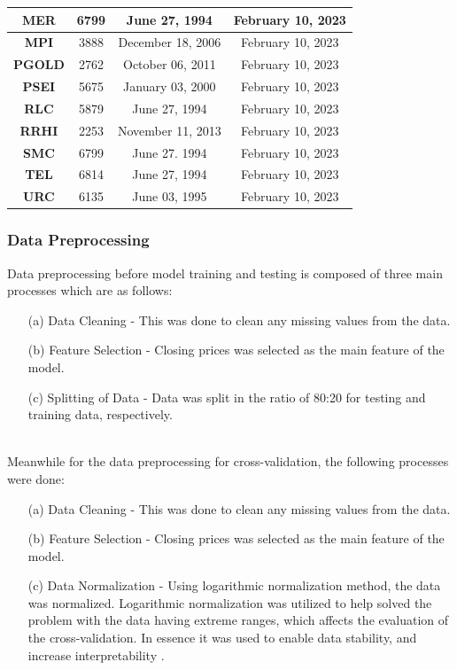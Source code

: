 \begin{longtable}{|c|c|c|c|}
    \textbf{MER}   & 6799                & June 27, 1994       & February 10, 2023 \\ \hline
    \textbf{MPI}   & 3888                & December 18, 2006   & February 10, 2023 \\ \hline
    \textbf{PGOLD} & 2762                & October 06, 2011    & February 10, 2023 \\ \hline
    \rowcolor[HTML]{9AFF99} 
    \textbf{PSEI}  & 5675                & January 03, 2000    & February 10, 2023 \\ \hline
    \textbf{RLC}   & 5879                & June 27, 1994       & February 10, 2023 \\ \hline
    \textbf{RRHI}  & 2253                & November 11, 2013   & February 10, 2023 \\ \hline
    \textbf{SMC}   & 6799                & June 27. 1994       & February 10, 2023 \\ \hline
    \textbf{TEL}   & 6814                & June 27, 1994       & February 10, 2023 \\ \hline
    \textbf{URC}   & 6135                & June 03, 1995       & February 10, 2023 \\ \hline
\end{longtable}

\subsubsection{Data Preprocessing}
\label{subsubsec:model_data_processing}
Data preprocessing before model training and testing is composed of three main processes which are as follows:
\begin{itemize}
    \item[(a)] Data Cleaning - This was done to clean any missing values from the data.
    \item[(b)] Feature Selection - Closing prices was selected as the main feature of the model.
    \item[(c)] Splitting of Data - Data was split in the ratio of 80:20 for testing and training data, respectively.
\end{itemize}
\hfill \\
Meanwhile for the data preprocessing for cross-validation, the following processes were done:
\begin{itemize}
    \item[(a)] Data Cleaning - This was done to clean any missing values from the data.
    \item[(b)] Feature Selection - Closing prices was selected as the main feature of the model.
    \item[(c)] Data Normalization - Using logarithmic normalization method, the data was normalized.
    Logarithmic normalization was utilized to help solved the problem with the data having extreme ranges,
    which affects the evaluation of the cross-validation. In essence it was used to enable data stability, and
    increase interpretability \cite{Baeldung2022, Bex2021, Andrew2019}.
\end{itemize}

